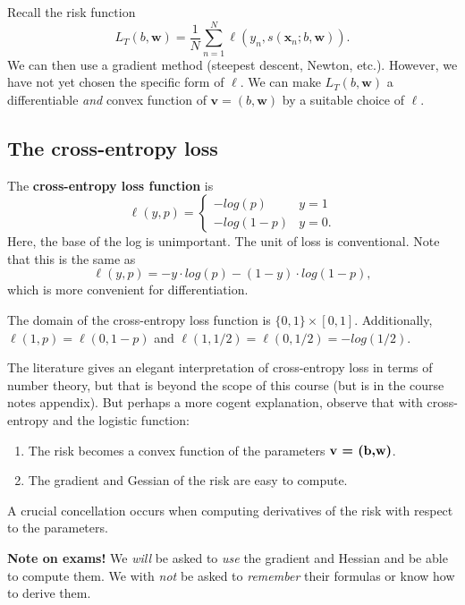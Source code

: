 \documentclass[titlepage, 12pt, leqno]{article}
\begin{document}
Recall the risk function
\[
L_{T}(b,\textbf{w}) = \frac{1}{N}\sum_{n=1}^{N}\ell(y_{n}, s(\textbf{x}_{n};
b,\textbf{w})).
\]
We can then use a gradient method (steepest descent, Newton, etc.). However, we have not
yet chosen the specific form of $\ell$. We can make $L_{T}(b,\textbf{w})$ a 
differentiable \textit{and} convex function of $\textbf{v}=(b,\textbf{w})$ by a suitable
choice of $\ell$.

\subsection{The cross-entropy loss}
\begin{definition}
    The \textbf{cross-entropy loss function} is
    \[
    \ell(y,p) = 
    \begin{cases}
        -log(p) & y=1 \\
        -log(1-p) & y=0.
    \end{cases}
    \]
    Here, the base of the log is unimportant. The unit of loss is conventional. Note that
    this is the same as
    \[
    \ell(y,p) = -y\cdot log(p) - (1-y)\cdot log(1-p),
    \]
    which is more convenient for differentiation.

    The domain of the cross-entropy loss function is $\{0,1\} \times [0,1]$. 
    Additionally, $\ell(1,p)=\ell(0,1-p)$ and $\ell(1,1/2) = \ell(0,1/2) = -log(1/2)$.
\end{definition}

The literature gives an elegant interpretation of cross-entropy loss in terms of number
theory, but that is beyond the scope of this course (but is in the course notes
appendix). But perhaps a more cogent explanation, observe that with cross-entropy and
the logistic function:
\begin{enumerate}
    \item The risk becomes a convex function of the parameters 
        $\textbf{v = (b,\textbf{w})}$.
    \item The gradient and Gessian of the risk are easy to compute.
\end{enumerate}

A crucial concellation occurs when computing derivatives of the risk with respect to the
parameters.

\begin{note}
    \textbf{Note on exams!} We \textit{will} be asked to \textit{use} the gradient and
    Hessian and be able to compute them. We with \textit{not} be asked to 
    \textit{remember} their formulas or know how to derive them.
\end{note}
\end{document}

